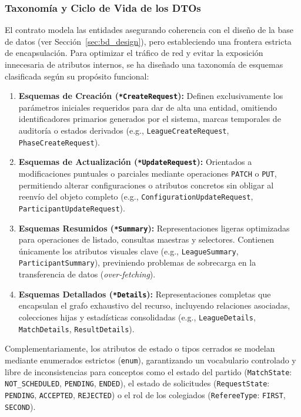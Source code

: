 \subsubsection{Taxonomía y Ciclo de Vida de los DTOs}
El contrato modela las entidades asegurando coherencia con el diseño de la base de datos (ver Sección~\ref{sec:bd_design}), pero estableciendo una frontera estricta de encapsulación. Para optimizar el tráfico de red y evitar la exposición innecesaria de atributos internos, se ha diseñado una taxonomía de esquemas clasificada según su propósito funcional:

\begin{enumerate}
    \item \textbf{Esquemas de Creación (\texttt{*CreateRequest}):} Definen exclusivamente los parámetros iniciales requeridos para dar de alta una entidad, omitiendo identificadores primarios generados por el sistema, marcas temporales de auditoría o estados derivados (e.g., \texttt{LeagueCreateRequest}, \texttt{PhaseCreateRequest}).
    
    \item \textbf{Esquemas de Actualización (\texttt{*UpdateRequest}):} Orientados a modificaciones puntuales o parciales mediante operaciones \texttt{PATCH} o \texttt{PUT}, permitiendo alterar configuraciones o atributos concretos sin obligar al reenvío del objeto completo (e.g., \texttt{ConfigurationUpdateRequest}, \texttt{ParticipantUpdateRequest}).
    
    \item \textbf{Esquemas Resumidos (\texttt{*Summary}):} Representaciones ligeras optimizadas para operaciones de listado, consultas maestras y selectores. Contienen únicamente los atributos visuales clave (e.g., \texttt{LeagueSummary}, \texttt{ParticipantSummary}), previniendo problemas de sobrecarga en la transferencia de datos (\textit{over-fetching}).
    
    \item \textbf{Esquemas Detallados (\texttt{*Details}):} Representaciones completas que encapsulan el grafo exhaustivo del recurso, incluyendo relaciones asociadas, colecciones hijas y estadísticas consolidadas (e.g., \texttt{LeagueDetails}, \texttt{MatchDetails}, \texttt{ResultDetails}).
\end{enumerate}

Complementariamente, los atributos de estado o tipos cerrados se modelan mediante enumerados estrictos (\texttt{enum}), garantizando un vocabulario controlado y libre de inconsistencias para conceptos como el estado del partido (\texttt{MatchState}: \texttt{NOT\_SCHEDULED}, \texttt{PENDING}, \texttt{ENDED}), el estado de solicitudes (\texttt{RequestState}: \texttt{PENDING}, \texttt{ACCEPTED}, \texttt{REJECTED}) o el rol de los colegiados (\texttt{RefereeType}: \texttt{FIRST}, \texttt{SECOND}).

